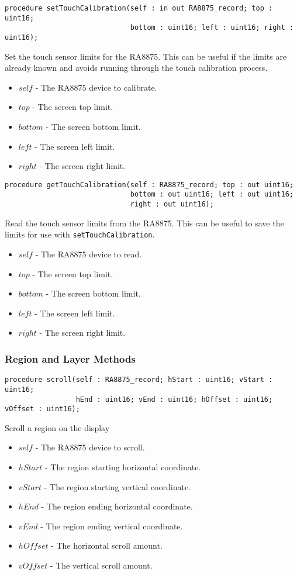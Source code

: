 \documentclass[10pt, openany]{book}
\newcommand{\function}[1]{\texttt{#1}}
\begin{document}
\begin{lstlisting}
procedure setTouchCalibration(self : in out RA8875_record; top : uint16;
                              bottom : uint16; left : uint16; right : uint16);
\end{lstlisting}
Set the touch sensor limits for the RA8875.  This can be useful if the limits are already known and avoids running through the touch calibration process.
\begin{itemize}
  \item $self$ - The RA8875 device to calibrate.
  \item $top$ - The screen top limit.
  \item $bottom$ - The screen bottom limit.
  \item $left$ - The screen left limit.
  \item $right$ - The screen right limit.
\end{itemize}

\begin{lstlisting}
procedure getTouchCalibration(self : RA8875_record; top : out uint16;
                              bottom : out uint16; left : out uint16;
                              right : out uint16);
\end{lstlisting}
Read the touch sensor limits from the RA8875.  This can be useful to save the limits for use with \function{setTouchCalibration}.
\begin{itemize}
  \item $self$ - The RA8875 device to read.
  \item $top$ - The screen top limit.
  \item $bottom$ - The screen bottom limit.
  \item $left$ - The screen left limit.
  \item $right$ - The screen right limit.
\end{itemize}

\subsubsection{Region and Layer Methods}
\begin{lstlisting}
procedure scroll(self : RA8875_record; hStart : uint16; vStart : uint16;
                 hEnd : uint16; vEnd : uint16; hOffset : uint16; vOffset : uint16);
\end{lstlisting}
Scroll a region on the display
\begin{itemize}
  \item $self$ - The RA8875 device to scroll.
  \item $hStart$ - The region starting horizontal coordinate.
  \item $vStart$ - The region starting vertical coordinate.
  \item $hEnd$ - The region ending horizontal coordinate.
  \item $vEnd$ - The region ending vertical coordinate.
  \item $hOffset$ - The horizontal scroll amount.
  \item $vOffset$ - The vertical scroll amount.
\end{itemize}
\end{document}
